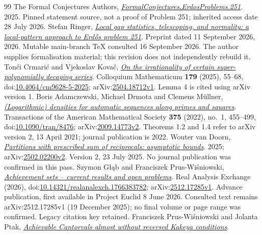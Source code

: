 \begin{thebibliography}{99}
 {The Formal Conjectures Authors}, \href{https://github.com/google-deepmind/formal-conjectures/blob/f776d2f2039351b00737ffcafb9d7d7666e1d9af/FormalConjectures/ErdosProblems/251.lean}{\emph{FormalConjectures.ErdosProblems.251}}.
  2025. Pinned statement source, not a proof of Problem 251; inherited access date 28 July 2026.
 Stefan Ringer, \href{https://github.com/StefanRinger/erdos-251}{\emph{Local gap statistics, telescoping, and normality: a local-pattern approach to Erd\H{o}s problem 251}}.
  Preprint dated 11 September 2026, 2026. Mutable main-branch TeX consulted 16 September 2026. The author supplies formalisation material; this revision does not independently rebuild it.
 Ton\'{c}i Crmari\'{c} and Vjekoslav Kova\v{c}, \href{https://arxiv.org/abs/2504.18712v1}{\emph{On the irrationality of certain super-polynomially decaying series}}.
  Colloquium Mathematicum \textbf{179} (2025), 55--68, doi:\href{https://doi.org/10.4064/cm9628-5-2025}{10.4064/cm9628-5-2025}; arXiv:\href{https://arxiv.org/abs/2504.18712v1}{2504.18712v1}. Lemma 4 is cited using arXiv version 1.
 Boris Adamczewski, Michael Drmota and Clemens M\"ullner, \href{https://arxiv.org/abs/2009.14773v2}{\emph{(Logarithmic) densities for automatic sequences along primes and squares}}.
  Transactions of the American Mathematical Society \textbf{375} (2022), no.~1, 455--499, doi:\href{https://doi.org/10.1090/tran/8476}{10.1090/tran/8476}; arXiv:\href{https://arxiv.org/abs/2009.14773v2}{2009.14773v2}. Theorems 1.2 and 1.4 refer to arXiv version 2, 13 April 2021; journal publication is 2022.
 Wouter van Doorn, \href{https://arxiv.org/abs/2502.02200v2}{\emph{Partitions with prescribed sum of reciprocals: asymptotic bounds}}.
  2025; arXiv:\href{https://arxiv.org/abs/2502.02200v2}{2502.02200v2}. Version 2, 23 July 2025. No journal publication was confirmed in this pass.
 Szymon G{\l}\k{a}b and Franciszek Prus-Wi\'sniowski, \href{https://arxiv.org/abs/2512.17285v1}{\emph{Achievement sets -- current results and open problems}}.
  Real Analysis Exchange (2026), doi:\href{https://doi.org/10.14321/realanalexch.1766383782}{10.14321/realanalexch.1766383782}; arXiv:\href{https://arxiv.org/abs/2512.17285v1}{2512.17285v1}. Advance publication, first available in Project Euclid 8 June 2026. Consulted text remains arXiv:2512.17285v1 (19 December 2025); no final volume or page range was confirmed. Legacy citation key retained.
 Franciszek Prus-Wi\'sniowski and Jolanta Ptak, \href{https://arxiv.org/abs/2412.08768v1}{\emph{Achievable Cantorvals almost without reversed Kakeya conditions}}.

\end{thebibliography}
